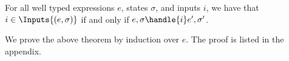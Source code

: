 \begin{theorem}
  For all well typed expressions $e$, states $\sigma$, and inputs $i$,
  we have that $i \in \Inputs{(e,\sigma)}$ if and only if $e,\sigma \handle{i} e',\sigma'$.
  \label{thm:safety-i}
\end{theorem}

We prove the above theorem by induction over $e$. The proof is listed in the
appendix.
